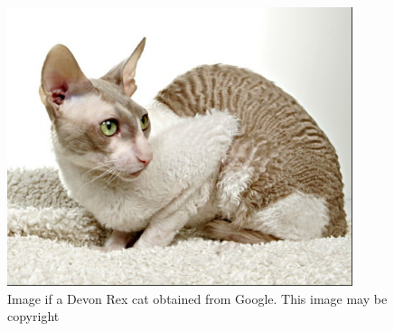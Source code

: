 %

\begin{figure}[!h]
  \centering
   \includegraphics[width=0.9\textwidth]{drex.png}
  \caption{Image if a Devon Rex cat obtained from Google. This image may be copyright}
  \label{fig:drex}
\end{figure}

%

